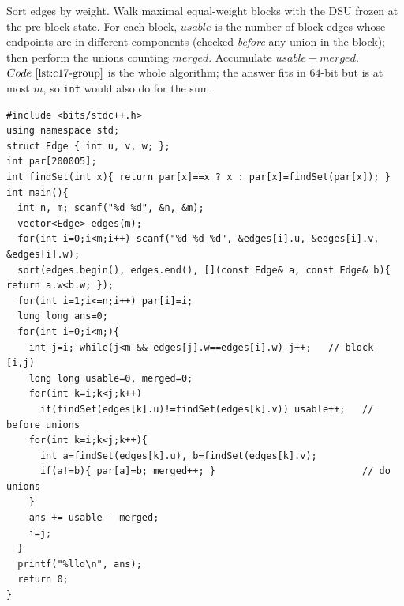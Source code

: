 Sort edges by weight.  Walk maximal equal-weight blocks with the DSU frozen at the
pre-block state.  For each block, \(\mathit{usable}\) is the number of block edges
whose endpoints are in different components (checked \emph{before} any union in
the block); then perform the unions counting \(\mathit{merged}\).  Accumulate
\(\mathit{usable}-\mathit{merged}\).  \(\coderef{c17-group}\) is the whole
algorithm; the answer fits in \(64\)-bit but is at most \(m\), so \texttt{int}
would also do for the sum.

\begin{lstlisting}[caption={CF 1108F. Sort by weight; per equal-weight block count usable (against the pre-block DSU) then merged (after unioning), and add the difference. Exactly the two-scan loop of optionalExcess}, label={lst:c17-unify}]
#include <bits/stdc++.h>
using namespace std;
struct Edge { int u, v, w; };
int par[200005];
int findSet(int x){ return par[x]==x ? x : par[x]=findSet(par[x]); }
int main(){
  int n, m; scanf("%d %d", &n, &m);
  vector<Edge> edges(m);
  for(int i=0;i<m;i++) scanf("%d %d %d", &edges[i].u, &edges[i].v, &edges[i].w);
  sort(edges.begin(), edges.end(), [](const Edge& a, const Edge& b){ return a.w<b.w; });
  for(int i=1;i<=n;i++) par[i]=i;
  long long ans=0;
  for(int i=0;i<m;){
    int j=i; while(j<m && edges[j].w==edges[i].w) j++;   // block [i,j)
    long long usable=0, merged=0;
    for(int k=i;k<j;k++)
      if(findSet(edges[k].u)!=findSet(edges[k].v)) usable++;   // before unions
    for(int k=i;k<j;k++){
      int a=findSet(edges[k].u), b=findSet(edges[k].v);
      if(a!=b){ par[a]=b; merged++; }                          // do unions
    }
    ans += usable - merged;
    i=j;
  }
  printf("%lld\n", ans);
  return 0;
}
\end{lstlisting}

